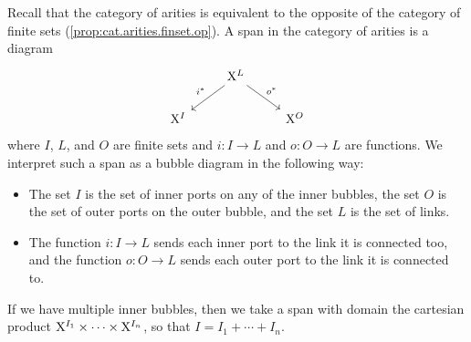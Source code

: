 \documentclass[DynamicalBook]{subfiles}
\begin{document}
Recall that the category of arities is equivalent to the opposite of the
category of finite sets (\cref{prop:cat.arities.finset.op}). A span in the
category of arities is a diagram
\[
\begin{tikzcd}
	& {\XX^L} \\
	{\XX^I} && {\XX^O}
	\arrow["{i^{\ast}}"', from=1-2, to=2-1]
	\arrow["{o^{\ast}}", from=1-2, to=2-3]
\end{tikzcd}
\]
where $I$, $L$, and $O$ are finite sets and $i : I \to L$ and $o : O \to L$ are
functions. We interpret such a span as a bubble diagram in the following way:
\begin{itemize}
  \item The set $I$ is the set of inner ports on any of the inner bubbles, the
    set $O$ is the set of outer ports on the outer bubble, and the set $L$ is
    the set of links.
  \item The function $i : I \to L$ sends each inner port to the link it is
    connected too, and the function $o : O \to L$ sends each outer port to the
    link it is connected to.
\end{itemize}
If we have multiple inner bubbles, then we take a span with domain the cartesian
product $\mathrm{X}^{I_1} \times \cdots \times \mathrm{X}^{I_n}$, so that $I = I_1 + \cdots +
I_n$.
\end{document}
